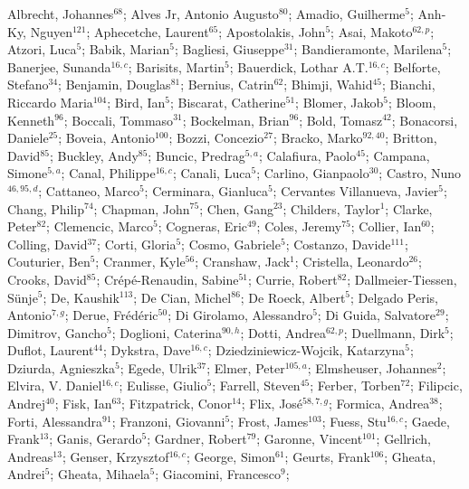 Albrecht, Johannes$^{68}$;
Alves Jr, Antonio Augusto$^{80}$;
Amadio, Guilherme$^{5}$;
Anh-Ky, Nguyen$^{121}$;
Aphecetche, Laurent$^{65}$;
Apostolakis, John$^{5}$;
Asai, Makoto$^{62,p}$;
Atzori, Luca$^{5}$;
Babik, Marian$^{5}$;
Bagliesi, Giuseppe$^{31}$;
Bandieramonte, Marilena$^{5}$;
Banerjee, Sunanda$^{16,c}$;
Barisits, Martin$^{5}$;
Bauerdick, Lothar A.T.$^{16,c}$;
Belforte, Stefano$^{34}$;
Benjamin, Douglas$^{81}$;
Bernius, Catrin$^{62}$;
Bhimji, Wahid$^{45}$;
Bianchi, Riccardo Maria$^{104}$;
Bird, Ian$^{5}$;
Biscarat, Catherine$^{51}$;
Blomer, Jakob$^{5}$;
Bloom, Kenneth$^{96}$;
Boccali, Tommaso$^{31}$;
Bockelman, Brian$^{96}$;
Bold, Tomasz$^{42}$;
Bonacorsi, Daniele$^{25}$;
Boveia, Antonio$^{100}$;
Bozzi, Concezio$^{27}$;
Bracko, Marko$^{92,40}$;
Britton, David$^{85}$;
Buckley, Andy$^{85}$;
Buncic, Predrag$^{5,a}$;
Calafiura, Paolo$^{45}$;
Campana, Simone$^{5,a}$;
Canal, Philippe$^{16,c}$;
Canali, Luca$^{5}$;
Carlino, Gianpaolo$^{30}$;
Castro, Nuno$^{46,95,d}$;
Cattaneo, Marco$^{5}$;
Cerminara, Gianluca$^{5}$;
Cervantes Villanueva, Javier$^{5}$;
Chang, Philip$^{74}$;
Chapman, John$^{75}$;
Chen, Gang$^{23}$;
Childers, Taylor$^{1}$;
Clarke, Peter$^{82}$;
Clemencic, Marco$^{5}$;
Cogneras, Eric$^{49}$;
Coles, Jeremy$^{75}$;
Collier, Ian$^{60}$;
Colling, David$^{37}$;
Corti, Gloria$^{5}$;
Cosmo, Gabriele$^{5}$;
Costanzo, Davide$^{111}$;
Couturier, Ben$^{5}$;
Cranmer, Kyle$^{56}$;
Cranshaw, Jack$^{1}$;
Cristella, Leonardo$^{26}$;
Crooks, David$^{85}$;
Crépé-Renaudin, Sabine$^{51}$;
Currie, Robert$^{82}$;
Dallmeier-Tiessen, Sünje$^{5}$;
De, Kaushik$^{113}$;
De Cian, Michel$^{86}$;
De Roeck, Albert$^{5}$;
Delgado Peris, Antonio$^{7,g}$;
Derue, Frédéric$^{50}$;
Di Girolamo, Alessandro$^{5}$;
Di Guida, Salvatore$^{29}$;
Dimitrov, Gancho$^{5}$;
Doglioni, Caterina$^{90,h}$;
Dotti, Andrea$^{62,p}$;
Duellmann, Dirk$^{5}$;
Duflot, Laurent$^{44}$;
Dykstra, Dave$^{16,c}$;
Dziedziniewicz-Wojcik, Katarzyna$^{5}$;
Dziurda, Agnieszka$^{5}$;
Egede, Ulrik$^{37}$;
Elmer, Peter$^{105,a}$;
Elmsheuser, Johannes$^{2}$;
Elvira, V. Daniel$^{16,c}$;
Eulisse, Giulio$^{5}$;
Farrell, Steven$^{45}$;
Ferber, Torben$^{72}$;
Filipcic, Andrej$^{40}$;
Fisk, Ian$^{63}$;
Fitzpatrick, Conor$^{14}$;
Flix, José$^{58,7,g}$;
Formica, Andrea$^{38}$;
Forti, Alessandra$^{91}$;
Franzoni, Giovanni$^{5}$;
Frost, James$^{103}$;
Fuess, Stu$^{16,c}$;
Gaede, Frank$^{13}$;
Ganis, Gerardo$^{5}$;
Gardner, Robert$^{79}$;
Garonne, Vincent$^{101}$;
Gellrich, Andreas$^{13}$;
Genser, Krzysztof$^{16,c}$;
George, Simon$^{61}$;
Geurts, Frank$^{106}$;
Gheata, Andrei$^{5}$;
Gheata, Mihaela$^{5}$;
Giacomini, Francesco$^{9}$;

